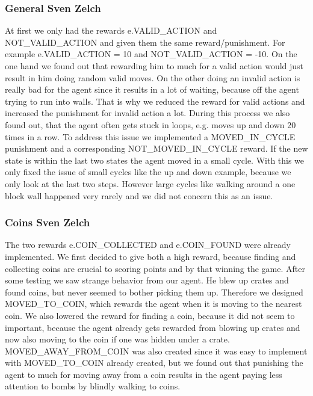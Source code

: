 \documentclass[
	letterpaper, %
	12pt, %
]{CSUniSchoolLabReport}
\begin{document}
\subsubsection{General \tiny Sven Zelch}
At first we only had the rewards e.VALID\_ACTION and NOT\_VALID\_ACTION and given them the same reward/punishment.
For example e.VALID\_ACTION = 10 and NOT\_VALID\_ACTION = -10.
On the one hand we found out that rewarding him to much for a valid action would just result in him doing random valid moves.
On the other doing an invalid action is really bad for the agent since it results in a lot of waiting, because off the agent trying to run into walls. 
That is why we reduced the reward for valid actions and increased the punishment for invalid action a lot.
During this process we also found out, that the agent often gets stuck in loops, e.g. moves up and down 20 times in a row.
To address this issue we implemented a MOVED\_IN\_CYCLE punishment and a corresponding NOT\_MOVED\_IN\_CYCLE reward.
If the new state is within the last two states the agent moved in a small cycle.
With this we only fixed the issue of small cycles like the up and down example, because we only look at the last two steps.
However large cycles like walking around a one block wall happened very rarely and we did not concern this as an issue.

\subsubsection{Coins \tiny Sven Zelch}
The two rewards e.COIN\_COLLECTED and e.COIN\_FOUND were already implemented. 
We first decided to give both a high reward, because finding and collecting coins are crucial to scoring points and by that winning the game.
After some testing we saw strange behavior from our agent. He blew up crates and found coins, but never seemed to bother picking them up.
Therefore we designed MOVED\_TO\_COIN, which rewards the agent when it is moving to the nearest coin. 
We also lowered the reward for finding a coin, because it did not seem to important, because the agent already gets rewarded from blowing up crates and now also moving to the coin if one was hidden under a crate.
MOVED\_AWAY\_FROM\_COIN was also created since it was easy to implement with MOVED\_TO\_COIN already created, but we found out that punishing the agent to much for moving away from a coin results in the agent paying less attention to bombs by blindly walking to coins.
\end{document}
